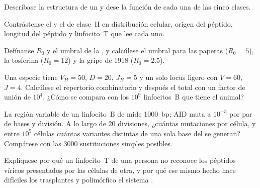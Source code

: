 \begin{exercise}[$\star$]\label{exo:b3:adaptive-immunity:2}
Descríbase la estructura de un  y dese la función de cada una
de las cinco clases.
\end{exercise}

\begin{exercise}[$\star$]\label{exo:b3:adaptive-immunity:3}
Contrástense el  y el de clase~II en distribución celular,
origen del péptido, longitud del péptido y linfocito~T que lee cada uno.
\end{exercise}

\begin{exercise}[$\star$]\label{exo:b3:adaptive-immunity:4}
Defínanse $R_{0}$ y el umbral de la , y calcúlese el
umbral para las paperas ($R_{0} = 5$), la tosferina ($R_{0} = 12$) y la
gripe de 1918 ($R_{0} = 2.5$).
\end{exercise}

\begin{exercise}[$\star\star$]\label{exo:b3:adaptive-immunity:5}
Una especie tiene $V_{H} = 50$, $D = 20$, $J_{H} = 5$ y un solo locus
ligero con $V = 60$, $J = 4$. Calcúlese el repertorio combinatorio y
después el total con un factor de unión de $10^{4}$. ¿Cómo se compara con
los $10^{9}$ linfocitos~B que tiene el animal?
\end{exercise}

\begin{exercise}[$\star\star$]\label{exo:b3:adaptive-immunity:6}
La región variable de un linfocito~B de  mide
\qty{1000}{bp}; AID muta a $10^{-3}$ por par de bases y división. A lo
largo de $20$ divisiones, ¿cuántas mutaciones por célula, y entre
$10^{5}$ células cuántas variantes distintas de una sola base del
 se generan? Compárese con las $3000$ sustituciones simples
posibles.
\end{exercise}

\begin{exercise}[$\star\star$]\label{exo:b3:adaptive-immunity:7}
Explíquese por qué un linfocito~T de una persona no reconoce los péptidos
víricos presentados por las células de otra, y por qué ese mismo hecho
hace difíciles los trasplantes y polimórfico el sistema .
\end{exercise}

